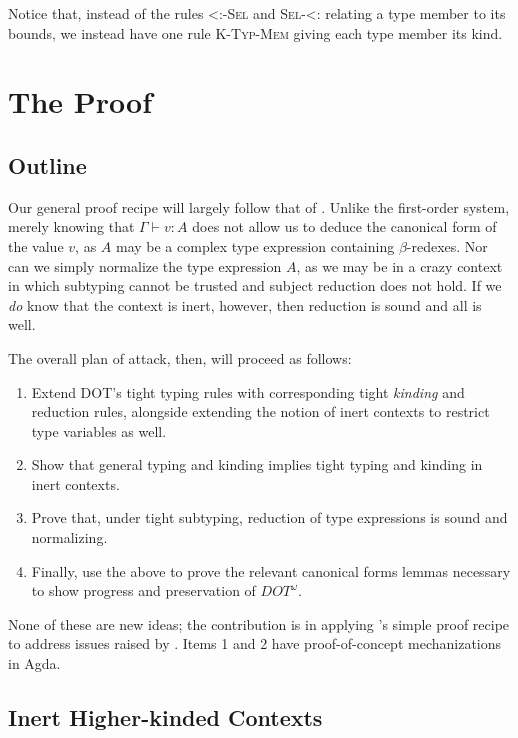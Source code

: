 \documentclass[a4paper, 10pt]{article}
\newcommand{\DOTw}{\ensuremath{DOT^\omega}}
\begin{document}
Notice that, instead of the rules \textsc{<:-Sel} and \textsc{Sel-<:} relating
a type member to its bounds, we instead have one rule \textsc{K-Typ-Mem} giving
each type member its kind.

\section{The Proof}

\subsection{Outline}\label{sec:outline}

Our general proof recipe will largely follow that of \citet{rapoport2017}.
Unlike the first-order system, merely knowing that $\Gamma \vdash v: A$ does
not allow us to deduce the canonical form of the value $v$, as $A$ may be a
complex type expression containing $\beta$-redexes. Nor can we simply normalize
the type expression $A$, as we may be in a crazy context in which subtyping
cannot be trusted and subject reduction does not hold. If we \emph{do} know
that the context is inert, however, then reduction is sound and all is well.

The overall plan of attack, then, will proceed as follows:

\begin{enumerate}
  \item Extend DOT's tight typing rules with corresponding tight \emph{kinding}
    and reduction rules, alongside extending the notion of inert contexts to
    restrict type variables as well.
  \item Show that general typing and kinding implies tight typing and kinding
    in inert contexts.
  \item Prove that, under tight subtyping, reduction of type expressions is
    sound and normalizing.
  \item Finally, use the above to prove the relevant canonical forms lemmas
    necessary to show progress and preservation of $\DOTw$.
\end{enumerate}

None of these are new ideas; the contribution is in applying
\citet{rapoport2017}'s simple proof recipe to address issues raised by
\citet{stucki2017}. Items 1 and 2 have proof-of-concept mechanizations in Agda.

\subsection{Inert Higher-kinded Contexts}
\end{document}
